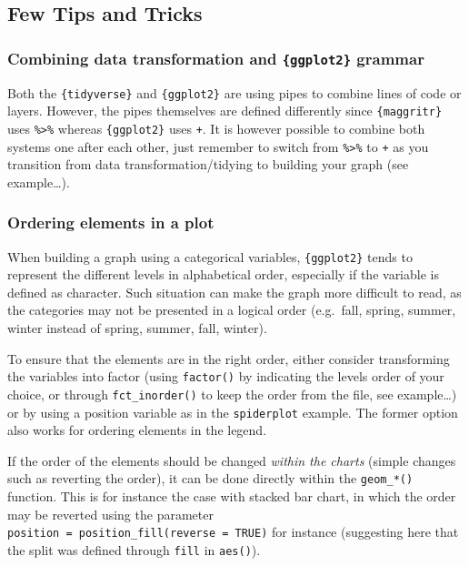 \documentclass[
]{book}
\begin{document}
\hypertarget{few-tips-and-tricks}{%
\subsection{Few Tips and Tricks}\label{few-tips-and-tricks}}

\hypertarget{combining-data-transformation-and-ggplot2-grammar}{%
\subsubsection{\texorpdfstring{Combining data transformation and \texttt{\{ggplot2\}} grammar}{Combining data transformation and \{ggplot2\} grammar}}\label{combining-data-transformation-and-ggplot2-grammar}}

Both the \texttt{\{tidyverse\}} and \texttt{\{ggplot2\}} are using pipes to combine lines of code or layers.
However, the pipes themselves are defined differently since \texttt{\{maggritr\}} uses \texttt{\%\textgreater{}\%} whereas \texttt{\{ggplot2\}} uses \texttt{+}.
It is however possible to combine both systems one after each other, just remember to switch from \texttt{\%\textgreater{}\%} to \texttt{+} as you transition from data transformation/tidying to building your graph (see example\ldots).

\hypertarget{ordering-elements-in-a-plot}{%
\subsubsection{Ordering elements in a plot}\label{ordering-elements-in-a-plot}}

When building a graph using a categorical variables, \texttt{\{ggplot2\}} tends to represent the different levels in alphabetical order, especially if the variable is defined as character. Such situation can make the graph more difficult to read, as the categories may not be presented in a logical order (e.g.~fall, spring, summer, winter instead of spring, summer, fall, winter).

To ensure that the elements are in the right order, either consider transforming the variables into factor (using \texttt{factor()} by indicating the levels order of your choice, or through \texttt{fct\_inorder()} to keep the order from the file, see example\ldots) or by using a position variable as in the \texttt{spiderplot} example. The former option also works for ordering elements in the legend.

If the order of the elements should be changed \emph{within the charts} (simple changes such as reverting the order), it can be done directly within the \texttt{geom\_*()} function. This is for instance the case with stacked bar chart, in which the order may be reverted using the parameter \texttt{position\ =\ position\_fill(reverse\ =\ TRUE)} for instance (suggesting here that the split was defined through \texttt{fill} in \texttt{aes()}).
\end{document}
